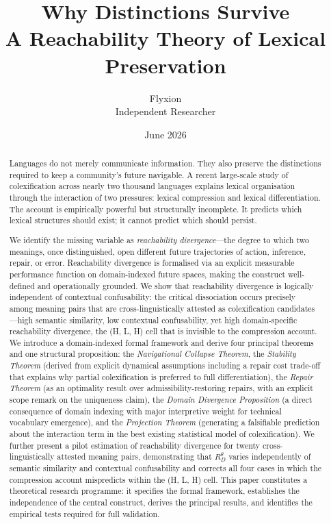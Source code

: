 \documentclass[12pt]{article}
\title{\textbf{Why Distinctions Survive}\\[6pt]
\large A Reachability Theory of Lexical Preservation}
\author{Flyxion\\[4pt]
\small Independent Researcher}
\date{June 2026}
\theoremstyle{rthm}
\theoremstyle{rdef}
\theoremstyle{remark}
\newcommand{\RD}[1][\theta]{R_{D}^{#1}}
\begin{document}
\maketitle
\thispagestyle{empty}

\begin{abstract}
\noindent
Languages do not merely communicate information. They also preserve the
distinctions required to keep a community's future navigable. A recent
large-scale study of colexification across nearly two thousand languages
explains lexical organisation through the interaction of two pressures:
lexical compression and lexical differentiation. The account is empirically
powerful but structurally incomplete. It predicts which lexical structures
should exist; it cannot predict which should persist.

We identify the missing variable as \emph{reachability divergence}---the
degree to which two meanings, once distinguished, open different future
trajectories of action, inference, repair, or error. Reachability divergence
is formalised via an explicit measurable performance function on domain-indexed
future spaces, making the construct well-defined and operationally grounded.
We show that reachability divergence is logically independent of contextual
confusability: the critical dissociation occurs precisely among meaning pairs
that are cross-linguistically attested as colexification candidates---high
semantic similarity, low contextual confusability, yet high domain-specific
reachability divergence, the (H, L, H) cell that is invisible to the
compression account. We introduce a domain-indexed formal framework and derive
four principal theorems and one structural proposition: the \emph{Navigational
Collapse Theorem}, the \emph{Stability Theorem} (derived from explicit dynamical
assumptions including a repair cost trade-off that explains why partial
colexification is preferred to full differentiation), the \emph{Repair Theorem}
(as an optimality result over admissibility-restoring repairs, with an explicit
scope remark on the uniqueness claim), the \emph{Domain Divergence Proposition}
(a direct consequence of domain indexing with major interpretive weight for
technical vocabulary emergence), and the \emph{Projection Theorem} (generating
a falsifiable prediction about the interaction term in the best existing
statistical model of colexification). We further present a pilot estimation of
reachability divergence for twenty cross-linguistically attested meaning pairs,
demonstrating that $\RD$ varies independently of semantic similarity and
contextual confusability and corrects all four cases in which the compression
account mispredicts within the (H, L, H) cell. This paper constitutes a
theoretical research programme: it specifies the formal framework, establishes
the independence of the central construct, derives the principal results, and
identifies the empirical tests required for full validation.
\end{abstract}
\end{document}
